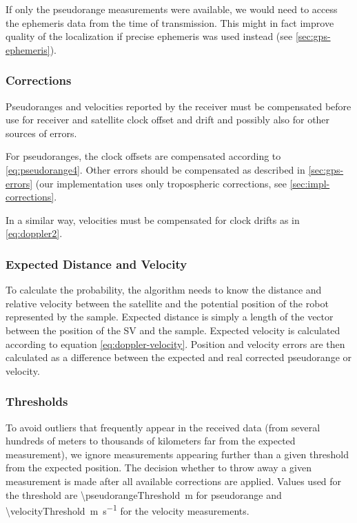 If only the pseudorange measurements were available, we would need to access the
ephemeris data from the time of transmission.
This might in fact improve quality of the localization if precise ephemeris
was used instead (see \cref{sec:gps-ephemeris}).

\subsubsection{Corrections}
Pseudoranges and velocities reported by the receiver must be compensated before
use for receiver and satellite clock offset and drift and possibly also for other
sources of errors.

For pseudoranges, the clock offsets are compensated according to \cref{eq:pseudorange4}.
Other errors should be compensated as described in \cref{sec:gps-errors}
(our implementation uses only tropospheric corrections, see \cref{sec:impl-corrections}.

In a similar way, velocities must be compensated for clock drifts 
as in \eqref{eq:doppler2}.

\subsubsection{Expected Distance and Velocity}
To calculate the probability, the algorithm needs to know the distance and relative
velocity between the satellite and the potential position of the robot represented
by the sample.
Expected distance is simply a length of the vector between the position of the SV
and the sample.
Expected velocity is calculated according to equation \eqref{eq:doppler-velocity}.
Position and velocity errors are then calculated as a difference between the expected
and real corrected pseudorange or velocity.

\subsubsection{Thresholds}
\label{sec:gps-thresholds}
To avoid outliers that frequently appear in the received data (from several hundreds
of meters to thousands of kilometers far from the expected measurement), we
ignore measurements appearing further than a given threshold from the expected position.
The decision whether to throw away a given measurement is made after all available corrections
are applied.
Values used for the threshold are \SI{\pseudorangeThreshold}{\meter} for pseudorange
and \SI{\velocityThreshold}{\meter\per\second} for the velocity measurements.

